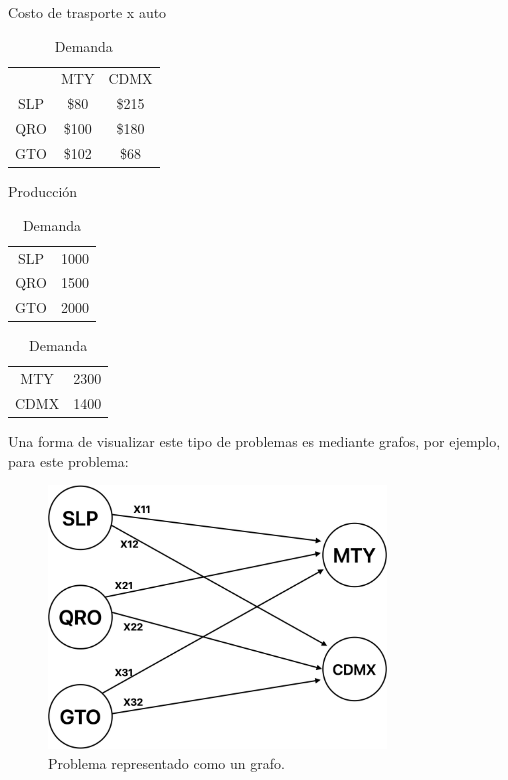 \documentclass[12pt]{article}  %
\begin{document}
\begin{table}[H]
    \centering
    \begin{minipage}{0.40\textwidth} %
        \centering
        \caption{Costo de trasporte x auto}
        \label{tab:costoProb1}
        \begin{tabular}{ccc}
            & MTY & CDMX \\
            SLP & \$80 & \$215 \\
            QRO & \$100 & \$180 \\
            GTO & \$102 & \$68 \\
        \end{tabular}
    \end{minipage}
    \hfill %
    \begin{minipage}{0.25\textwidth}
        \centering
        \caption{Producción}
        \label{tab:oferProb1}
        \begin{tabular}{cc}
            SLP & 1000 \\
            QRO & 1500 \\
            GTO & 2000 \\
        \end{tabular}
    \end{minipage}
    \hfill
    \begin{minipage}{0.28\textwidth}
        \centering
        \caption{Demanda}
        \label{tab:demProb1}
        \begin{tabular}{cc}
            MTY & 2300 \\
            CDMX & 1400 \\
        \end{tabular}
    \end{minipage}
\end{table}

Una forma de visualizar este tipo de problemas es mediante grafos, por ejemplo, para este problema:

\begin{figure}[H]
\centering
\caption{Problema representado como un grafo.}
\label{fig:grafoProb1}
\includegraphics[width=0.8\textwidth]{Prob1GrafImg.png}
\end{figure}
\end{document}
